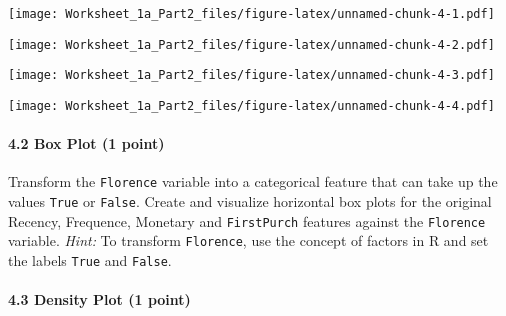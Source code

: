 \documentclass[
]{article}
\newenvironment{Shaded}{\begin{snugshade}}{\end{snugshade}}
\newcommand{\FunctionTok}[1]{\textcolor[rgb]{0.00,0.00,0.00}{#1}}
\newcommand{\NormalTok}[1]{#1}
\newcommand{\SpecialCharTok}[1]{\textcolor[rgb]{0.00,0.00,0.00}{#1}}
\begin{document}
\texttt{[image: Worksheet\_1a\_Part2\_files/figure-latex/unnamed-chunk-4-1.pdf]}

\begin{Shaded}
\end{Shaded}

\texttt{[image: Worksheet\_1a\_Part2\_files/figure-latex/unnamed-chunk-4-2.pdf]}

\begin{Shaded}
\end{Shaded}

\texttt{[image: Worksheet\_1a\_Part2\_files/figure-latex/unnamed-chunk-4-3.pdf]}

\begin{Shaded}
\end{Shaded}

\texttt{[image: Worksheet\_1a\_Part2\_files/figure-latex/unnamed-chunk-4-4.pdf]}

\hypertarget{box-plot-1-point}{%
\paragraph{4.2 Box Plot (1 point)}\label{box-plot-1-point}}

Transform the \texttt{Florence} variable into a categorical feature that
can take up the values \texttt{True} or \texttt{False}. Create and
visualize horizontal box plots for the original Recency, Frequence,
Monetary and \texttt{FirstPurch} features against the \texttt{Florence}
variable. \emph{Hint:} To transform \texttt{Florence}, use the concept
of factors in R and set the labels \texttt{True} and \texttt{False}.

\hypertarget{density-plot-1-point}{%
\paragraph{4.3 Density Plot (1 point)}\label{density-plot-1-point}}
\end{document}
